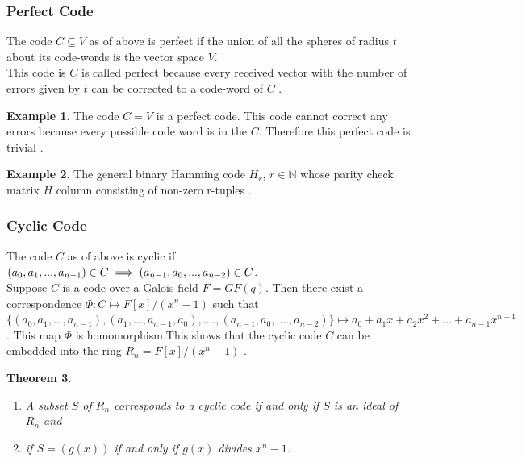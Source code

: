 \documentclass[11pt]{amsart}
\theoremstyle{plain}
\newtheorem{theorem}{Theorem}[section]
\theoremstyle{definition}
\newtheorem{example}[theorem]{Example}
\numberwithin{equation}{section}
\begin{document}
\subsubsection{Perfect Code}
The code \(C \subseteq V\) as of above is perfect if the union of all the spheres of radius \(t\) about its code-words is the vector space \(V\).\\
This code is \(C\) is called perfect because every received vector with the number of errors given by \(t\) can be corrected to a code-word of \(C\) \cite{error_correct}.

\begin{example}
  The code \(C=V\) is a perfect code. This code cannot correct any errors because every possible code word is in the \(C\). Therefore this perfect code is trivial \cite{error_correct}.
\end{example}

\begin{example}
  The general binary Hamming code \(H_r\), \(r \in \mathbb{N}\) whose parity check matrix \(H\) column consisting of non-zero r-tuples \cite{error_correct}.
\end{example}

\subsubsection{Cyclic Code}
The code \(C\) as of above is cyclic if \((a_0,a_1,...,a_{n-1}) \in C\\ \implies (a_{n-1},a_0,...,a_{n-2}) \in C\).\\
Suppose \(C\) is a code over a Galois field \(F=GF(q)\). Then there exist a correspondence \(\Phi : C \mapsto F[x]/(x^n-1)\) such that \(\{(a_0,a_1,...,a_{n-1}),(a_1,...,a_{n-1},a_0),....,(a_{n-1},a_0,....,a_{n-2})\} \longmapsto a_0+a_1x+a_2x^2+...+a_{n-1}x^{n-1}\). This map \(\Phi\) is homomorphism.This shows that the cyclic code \(C\) can be embedded into the ring \(R_n=F[x]/(x^n-1)\) \cite{error_correct}.

\begin{theorem} \cite{error_correct}
  \begin{enumerate}
  \item A subset \(S\) of \(R_n\) corresponds to a cyclic code if and only if \(S\) is an ideal of \(R_n\) and
  \item if \(S=(g(x))\) if and only if  \(g(x)\) divides \(x^n-1\).
  \end{enumerate}
\end{theorem}
\end{document}
